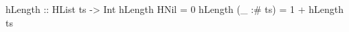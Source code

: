 \begin{code}
hLength :: HList ts -> Int
hLength HNil      = 0
hLength (_ :# ts) = 1 + hLength ts
\end{code}
